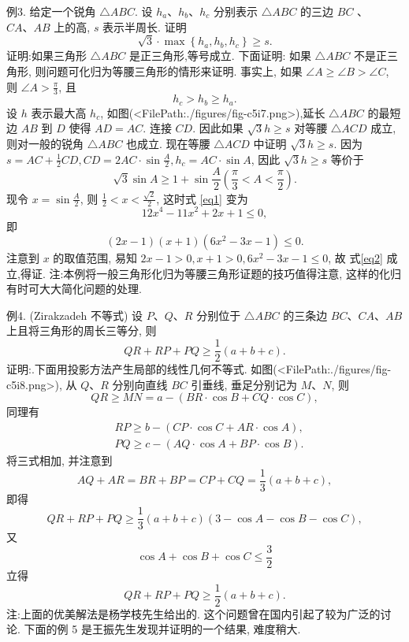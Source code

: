 例3. 给定一个锐角 $\triangle A B C$. 设 $h_a 、 h_b 、 h_c$ 分别表示 $\triangle A B C$ 的三边 $B C$ 、 $C A 、 A B$ 上的高, $s$ 表示半周长.
证明
$$
\sqrt{3} \cdot \max \left\{h_a, h_b, h_c\right\} \geqslant s .
$$
证明:如果三角形 $\triangle A B C$ 是正三角形,等号成立.
下面证明: 如果 $\triangle A B C$ 不是正三角形, 则问题可化归为等腰三角形的情形来证明.
事实上, 如果 $\angle A \geqslant \angle B>\angle C$, 则 $\angle A>\frac{\pi}{3}$, 且
$$
h_c>h_b \geqslant h_a .
$$
设 $h$ 表示最大高 $h_c$, 如图(<FilePath:./figures/fig-c5i7.png>),延长 $\triangle A B C$ 的最短边 $A B$ 到 $D$ 使得 $A D=A C$. 连接 $C D$. 因此如果 $\sqrt{3} h \geqslant s$ 对等腰 $\triangle A C D$ 成立,则对一般的锐角 $\triangle A B C$ 也成立.
现在等腰 $\triangle A C D$ 中证明 $\sqrt{3} h \geqslant s$.
因为 $s=A C+\frac{1}{2} C D, C D=2 A C \cdot \sin \frac{A}{2}, h_c= A C \cdot \sin A$, 因此 $\sqrt{3} h \geqslant s$ 等价于
$$
\sqrt{3} \sin A \geqslant 1+\sin \frac{A}{2}\left(\frac{\pi}{3}<A<\frac{\pi}{2}\right) . \label{eq1}
$$
现令 $x=\sin \frac{A}{2}$, 则 $\frac{1}{2}<x<\frac{\sqrt{2}}{2}$, 这时式 \ref{eq1} 变为
$$
12 x^4-11 x^2+2 x+1 \leqslant 0,
$$
即
$$
(2 x-1)(x+1)\left(6 x^2-3 x-1\right) \leqslant 0 . \label{eq2}
$$
注意到 $x$ 的取值范围, 易知 $2 x-1>0, x+1>0,6 x^2-3 x-1 \leqslant 0$, 故 式\ref{eq2} 成立,得证.
注:本例将一般三角形化归为等腰三角形证题的技巧值得注意, 这样的化归有时可大大简化问题的处理.



例4. (Zirakzadeh 不等式) 设 $P 、 Q 、 R$ 分别位于 $\triangle A B C$ 的三条边 $B C 、 C A 、 A B$ 上且将三角形的周长三等分, 则
$$
Q R+R P+P Q \geqslant \frac{1}{2}(a+b+c) .
$$
证明:.下面用投影方法产生局部的线性几何不等式.
如图(<FilePath:./figures/fig-c5i8.png>), 从 $Q 、 R$ 分别向直线 $B C$ 引垂线, 垂足分别记为 $M 、 N$, 则
$$
Q R \geqslant M N=a-(B R \cdot \cos B+C Q \cdot \cos C),
$$
同理有
$$
\begin{aligned}
& R P \geqslant b-(C P \cdot \cos C+A R \cdot \cos A), \\
& P Q \geqslant c-(A Q \cdot \cos A+B P \cdot \cos B) .
\end{aligned}
$$
将三式相加, 并注意到
$$
A Q+A R=B R+B P=C P+C Q=\frac{1}{3}(a+b+c),
$$
即得
$$
Q R+R P+P Q \geqslant \frac{1}{3}(a+b+c)(3-\cos A-\cos B-\cos C),
$$
又
$$
\cos A+\cos B+\cos C \leqslant \frac{3}{2}
$$
立得
$$
Q R+R P+P Q \geqslant \frac{1}{2}(a+b+c) .
$$
注:上面的优美解法是杨学枝先生给出的.
这个问题曾在国内引起了较为广泛的讨论.
下面的例 5 是王振先生发现并证明的一个结果, 难度稍大.



